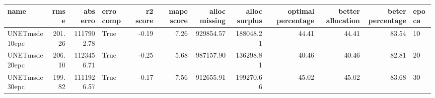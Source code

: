 \begin{tabular}{lrrlrrrrrrrl}
\toprule
name & rmse & abs erro & erro comp & r2 score & mape score & alloc missing & alloc surplus & optimal percentage & better allocation & beter percentage & epoca \\
\midrule
UNETmsde10epc & 201.26 & 1117902.78 & True & -0.19 & 7.26 & 929854.57 & 188048.21 & 44.41 & 44.41 & 83.54 & 10 \\
UNETmsde20epc & 206.10 & 1123456.71 & True & -0.25 & 5.68 & 987157.90 & 136298.81 & 40.46 & 40.46 & 82.81 & 20 \\
UNETmsde30epc & 199.82 & 1111926.57 & True & -0.17 & 7.56 & 912655.91 & 199270.66 & 45.02 & 45.02 & 83.68 & 30 \\
\bottomrule
\end{tabular}
